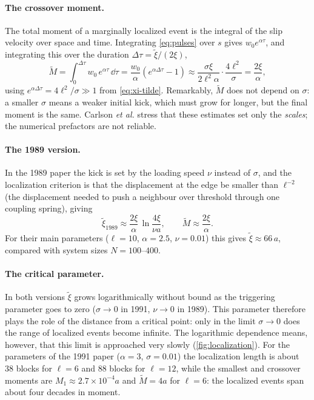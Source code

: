 \paragraph{The crossover moment.} The total moment of a marginally localized event is the integral of the slip velocity over space and
time. Integrating \cref{eq:pulses} over $s$ gives $w_0e^{\alpha\tau}$, and integrating this over the duration $\Delta\tau = \tilde\xi/(2\xi)$,
\begin{equation}
  \tilde M = \int_0^{\Delta\tau} w_0\,e^{\alpha\tau}\,\dd\tau = \frac{w_0}{\alpha}\left(e^{\alpha\Delta\tau}-1\right)
  \approx \frac{\sigma\xi}{2\ell^2\alpha}\cdot\frac{4\ell^2}{\sigma} = \frac{2\xi}{\alpha},
  \label{eq:M-tilde}
\end{equation}
using $e^{\alpha\Delta\tau} = 4\ell^2/\sigma\gg1$ from \cref{eq:xi-tilde}. Remarkably, $\tilde M$ does not depend on $\sigma$: a smaller
$\sigma$ means a weaker initial kick, which must grow for longer, but the final moment is the same. Carlson \emph{et al.} stress that these
estimates set only the \emph{scales}; the numerical prefactors are not reliable.

\paragraph{The 1989 version.} In the 1989 paper the kick is set by the loading speed $\nu$ instead of $\sigma$, and the localization criterion is
that the displacement at the edge be smaller than $\ell^{-2}$ (the displacement needed to push a neighbour over threshold through one coupling
spring), giving~\cite{CarlsonLanger1989}
\begin{equation}
  \tilde\xi_{1989} \approx \frac{2\xi}{\alpha}\,\ln\frac{4\xi}{\nu a},\qquad \tilde M \approx\frac{2\xi}{\alpha}.
\end{equation}
For their main parameters ($\ell=10$, $\alpha=2.5$, $\nu=0.01$) this gives $\tilde\xi\approx66\,a$, compared with system sizes $N=100$--$400$.

\paragraph{The critical parameter.} In both versions $\tilde\xi$ grows logarithmically without bound as the triggering parameter goes to zero
($\sigma\to0$ in 1991, $\nu\to0$ in 1989). This parameter therefore plays the role of the distance from a critical point: only in the limit
$\sigma\to0$ does the range of localized events become infinite. The logarithmic dependence means, however, that this limit is approached very
slowly (\cref{fig:localization}). For the parameters of the 1991 paper ($\alpha=3$, $\sigma=0.01$) the localization length is about 38 blocks for
$\ell=6$ and 88 blocks for $\ell=12$, while the smallest and crossover moments are $M_1\approx2.7\times10^{-4}a$ and $\tilde M=4a$ for $\ell=6$: the
localized events span about four decades in moment.

